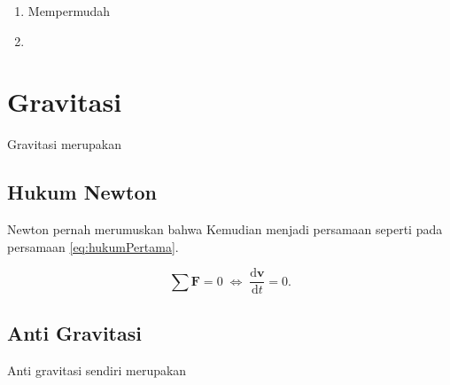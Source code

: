 \begin{enumerate}[nolistsep]

  \item Mempermudah \lipsum[1][1-2]
  \vspace{0.5ex}

  \item \lipsum[1][3-4]
  \vspace{0.5ex}

\end{enumerate}
\vspace{0.5ex}

\section{Gravitasi}
\vspace{1ex}

Gravitasi merupakan \lipsum[1]
\vspace{0.5ex}

\subsection{Hukum Newton}
\vspace{1ex}

Newton pernah merumuskan \citep{newtonLaw} bahwa \lipsum[2]
Kemudian menjadi persamaan seperti pada persamaan \ref{eq:hukumPertama}.
\vspace{0.5ex}

\begin{equation}
  \label{eq:hukumPertama}
  \sum \mathbf{F} = 0\; \Leftrightarrow\; \frac{\mathrm{d} \mathbf{v} }{\mathrm{d}t} = 0.
\end{equation}
\vspace{0.5ex}

\subsection{Anti Gravitasi}
\vspace{1ex}

Anti gravitasi sendiri merupakan \lipsum[3]
\vspace{0.5ex}